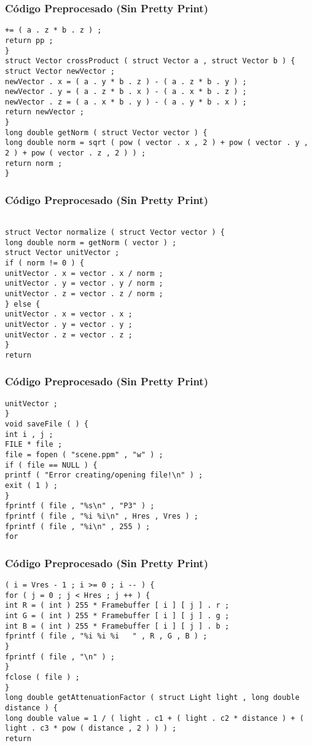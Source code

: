 \documentclass{beamer}
\begin{document}
\begin{frame}[fragile]
\frametitle{C\'odigo Preprocesado (Sin Pretty Print)}
\begin{lstlisting}[style=CStyle]
+= ( a . z * b . z ) ; 
return pp ; 
} 
struct Vector crossProduct ( struct Vector a , struct Vector b ) { 
struct Vector newVector ; 
newVector . x = ( a . y * b . z ) - ( a . z * b . y ) ; 
newVector . y = ( a . z * b . x ) - ( a . x * b . z ) ; 
newVector . z = ( a . x * b . y ) - ( a . y * b . x ) ; 
return newVector ; 
} 
long double getNorm ( struct Vector vector ) { 
long double norm = sqrt ( pow ( vector . x , 2 ) + pow ( vector . y , 2 ) + pow ( vector . z , 2 ) ) ; 
return norm ; 
} \end{lstlisting}
\end{frame}
\begin{frame}[fragile]
\frametitle{C\'odigo Preprocesado (Sin Pretty Print)}
\begin{lstlisting}[style=CStyle]

struct Vector normalize ( struct Vector vector ) { 
long double norm = getNorm ( vector ) ; 
struct Vector unitVector ; 
if ( norm != 0 ) { 
unitVector . x = vector . x / norm ; 
unitVector . y = vector . y / norm ; 
unitVector . z = vector . z / norm ; 
} else { 
unitVector . x = vector . x ; 
unitVector . y = vector . y ; 
unitVector . z = vector . z ; 
} 
return \end{lstlisting}
\end{frame}
\begin{frame}[fragile]
\frametitle{C\'odigo Preprocesado (Sin Pretty Print)}
\begin{lstlisting}[style=CStyle]
unitVector ; 
} 
void saveFile ( ) { 
int i , j ; 
FILE * file ; 
file = fopen ( "scene.ppm" , "w" ) ; 
if ( file == NULL ) { 
printf ( "Error creating/opening file!\n" ) ; 
exit ( 1 ) ; 
} 
fprintf ( file , "%s\n" , "P3" ) ; 
fprintf ( file , "%i %i\n" , Hres , Vres ) ; 
fprintf ( file , "%i\n" , 255 ) ; 
for \end{lstlisting}
\end{frame}
\begin{frame}[fragile]
\frametitle{C\'odigo Preprocesado (Sin Pretty Print)}
\begin{lstlisting}[style=CStyle]
( i = Vres - 1 ; i >= 0 ; i -- ) { 
for ( j = 0 ; j < Hres ; j ++ ) { 
int R = ( int ) 255 * Framebuffer [ i ] [ j ] . r ; 
int G = ( int ) 255 * Framebuffer [ i ] [ j ] . g ; 
int B = ( int ) 255 * Framebuffer [ i ] [ j ] . b ; 
fprintf ( file , "%i %i %i   " , R , G , B ) ; 
} 
fprintf ( file , "\n" ) ; 
} 
fclose ( file ) ; 
} 
long double getAttenuationFactor ( struct Light light , long double distance ) { 
long double value = 1 / ( light . c1 + ( light . c2 * distance ) + ( light . c3 * pow ( distance , 2 ) ) ) ; 
return \end{lstlisting}
\end{frame}
\end{document}
